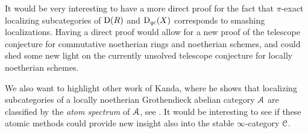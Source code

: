 \begin{remark}
    It would be very interesting to have a more direct proof for the fact that $\pi$-exact localizing subcategories of $\mathrm{D}(R)$ and $\mathrm{D}_{qc}(X)$ corresponds to smashing localizations. Having a direct proof would allow for a new proof of the telescope conjecture for commutative noetherian rings and noetherian schemes, and could shed some new light on the currently unsolved telescope conjecture for locally noetherian schemes. 
\end{remark}

\begin{remark}
    We also want to highlight other work of Kanda, where he shows that localizing subcategories of a locally noetherian Grothendieck abelian category $\EuScript{A}$ are classified by the \emph{atom spectrum} of $\EuScript{A}$, see \cite[5.5]{kanda_classifying_2012}. It would be interesting to see if these atomic methods could provide new insight also into the stable $\infty$-category $\EuScript{C}$. 
\end{remark}









